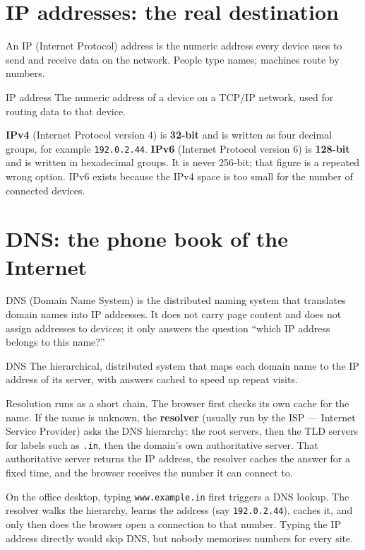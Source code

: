 \section{IP addresses: the real destination}
An IP (Internet Protocol) address is the numeric address every device uses
to send and receive data on the network. People type names; machines route
by numbers.

\begin{definitionbox}{IP address}
The numeric address of a device on a TCP/IP network, used for routing data
to that device.
\end{definitionbox}

\textbf{IPv4} (Internet Protocol version 4) is \textbf{32-bit} and is
written as four decimal groups, for example \texttt{192.0.2.44}.
\textbf{IPv6} (Internet Protocol version 6) is \textbf{128-bit} and is
written in hexadecimal groups. It is never 256-bit; that figure is a
repeated wrong option. IPv6 exists because the IPv4 space is too small for
the number of connected devices.

\section{DNS: the phone book of the Internet}
DNS (Domain Name System) is the distributed naming system that translates
domain names into IP addresses. It does not carry page content and does not
assign addresses to devices; it only answers the question ``which IP address
belongs to this name?''

\begin{definitionbox}{DNS}
The hierarchical, distributed system that maps each domain name to the IP
address of its server, with answers cached to speed up repeat visits.
\end{definitionbox}

Resolution runs as a short chain. The browser first checks its own cache
for the name. If the name is unknown, the \textbf{resolver} (usually run by
the ISP --- Internet Service Provider) asks the DNS hierarchy: the root
servers, then the TLD servers for labels such as \texttt{.in}, then the
domain's own authoritative server. That authoritative server returns the IP
address, the resolver caches the answer for a fixed time, and the browser
receives the number it can connect to.

\begin{example}
On the office desktop, typing \texttt{www.example.in} first triggers a DNS
lookup. The resolver walks the hierarchy, learns the address (say
\texttt{192.0.2.44}), caches it, and only then does the browser open a
connection to that number. Typing the IP address directly would skip DNS,
but nobody memorises numbers for every site.
\end{example}

